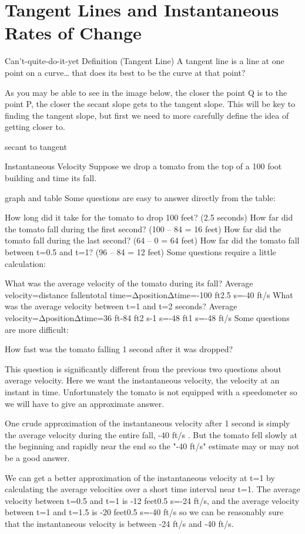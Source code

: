 \section{Tangent Lines and Instantaneous Rates of Change}
\label{sec:tangents}

Can't-quite-do-it-yet Definition (Tangent Line)
A tangent line is a line at one point on a curve… that does its best to be the curve at that point?

As you may be able to see in the image below, the closer the point Q is to the point P, the closer the secant slope gets to the tangent slope. This will be key to finding the tangent slope, but first we need to more carefully define the idea of getting closer to.

secant to tangent

Instantaneous Velocity
Suppose we drop a tomato from the top of a 100 foot building and time its fall.

graph and table
Some questions are easy to answer directly from the table:

How long did it take for the tomato to drop 100 feet? (2.5 seconds)
How far did the tomato fall during the first second? (100 – 84 = 16 feet)
How far did the tomato fall during the last second? (64 – 0 = 64 feet)
How far did the tomato fall between t=0.5 and t=1? (96 – 84 = 12 feet)
Some questions require a little calculation:

What was the average velocity of the tomato during its fall?
Average velocity=distance fallentotal time=ΔpositionΔtime=-100 ft2.5 s=-40 ft/s
What was the average velocity between t=1 and t=2 seconds?
Average velocity=ΔpositionΔtime=36 ft-84 ft2 s-1 s=-48 ft1 s=-48 ft/s
Some questions are more difficult:

How fast was the tomato falling 1 second after it was dropped?

This question is significantly different from the previous two questions about average velocity. Here we want the instantaneous velocity, the velocity at an instant in time. Unfortunately the tomato is not equipped with a speedometer so we will have to give an approximate answer.

One crude approximation of the instantaneous velocity after 1 second is simply the average velocity during the entire fall, -40 ft/s . But the tomato fell slowly at the beginning and rapidly near the end so the "-40 ft/s" estimate may or may not be a good answer.

We can get a better approximation of the instantaneous velocity at t=1 by calculating the average velocities over a short time interval near t=1. The average velocity between t=0.5 and t=1 is -12 feet0.5 s=-24 ft/s, and the average velocity between t=1 and t=1.5 is -20 feet0.5 s=-40 ft/s so we can be reasonably sure that the instantaneous velocity is between -24 ft/s and -40 ft/s.

